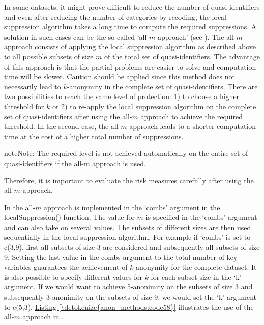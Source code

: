\documentclass[letterpaper,10pt,english]{sphinxmanual}
\begin{document}
In some datasets, it might prove difficult to reduce the number of
quasi-identifiers and even after reducing the number of categories by
recoding, the local suppression algorithm takes a long time to compute
the required suppressions. A solution in such cases can be the so-called
‘all-\(m\) approach’ (see {\hyperref[\detokenize{anon_methods:wolf15}]{}}). The all-\(m\)
approach consists of applying the local suppression algorithm as
described above to all possible subsets of size \(m\) of the total set of
quasi-identifiers. The advantage of this approach is that the partial
problems are easier to solve and computation time will be slower.
Caution should be applied since this method does not necessarily lead to
\(k\)-anonymity in the complete set of quasi-identifiers. There are
two possibilities to reach the same level of protection: 1) to choose a
higher threshold for \(k\) or 2) to re-apply the local suppression
algorithm on the complete set of quasi-identifiers after using the
all-\(m\) approach to achieve the required threshold. In the
second case, the all-\(m\) approach leads to a shorter computation
time at the cost of a higher total number of suppressions.

\begin{sphinxadmonition}{note}{Note:}
The required level is not achieved automatically on the entire set of
quasi-identifiers if the all-m approach is used.
\end{sphinxadmonition}

Therefore, it is important to evaluate the risk measures carefully after using the
all-\(m\) approach.

In  the all-\(m\) approach is implemented in the ‘combs’
argument in the localSuppression() function. The value for \(m\) is
specified in the ‘combs’ argument and can also take on several values.
The subsets of different sizes are then used sequentially in the local
suppression algorithm. For example if ‘combs’ is set to c(3,9), first
all subsets of size 3 are considered and subsequently all subsets of
size 9. Setting the last value in the combs argument to the total number
of key variables guarantees the achievement of \(k\)-anonymity for
the complete dataset. It is also possible to specify different values
for \(k\) for each subset size in the ‘k’ argument. If we would want to
achieve 5-anonimity on the subsets of size 3 and subsequently
3-anonimity on the subsets of size 9, we would set the ‘k’ argument to
c(5,3). \hyperref[\detokenize{anon_methods:code58}]{Listing \ref{\detokenize{anon_methods:code58}}} illustrates the use of the all-\(m\) approach
in .
\end{document}

